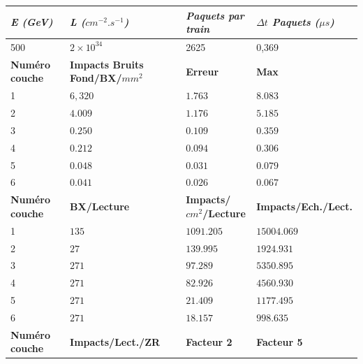 \begin{table}[h]
\centering
\scriptsize
\begin{tabular}{|l|l|l|l|}
\hline
\textit{\textbf{E (GeV)}}       & \textit{\textbf{L ($cm^{-2}.s^{-1}$)}}           & \textit{\textbf{Paquets par train}}         & \textit{\textbf{$\Delta t$ Paquets ($\mu s$)}} \\ \hline
500                             & $2 \times 10^{34}$      & 2625                                        & 0,369                              \\ \hline
\textbf{Numéro couche} & \textbf{Impacts Bruits Fond/BX/$mm^2$} & \textbf{Erreur}              & \textbf{Max}                \\ \hline
1             & $6,320$                 & $1.763$            & $8.083$               \\ \hline
2             & $4.009$                 & $1.176$            & $5.185$               \\ \hline
3             & $0.250$                 & $0.109$            & $0.359$               \\ \hline
4             & $0.212$                 & $0.094$            & $0.306$               \\ \hline
5             & $0.048$                 & $0.031$            & $0.079$               \\ \hline
6             & $0.041$                 & $0.026$            & $0.067$               \\ \hline
\textbf{Numéro couche} & \textbf{BX/Lecture}             & \textbf{Impacts/$cm^2$/Lecture} & \textbf{Impacts/Ech./Lect.} \\ \hline
1             & $135$                   & $1091.205$         & $15004.069$         \\ \hline
2             & $27$                    & $139.995$          & $1924.931$          \\ \hline
3             & $271$                   & $97.289$           & $5350.895$            \\ \hline
4             & $271$                   & $82.926$           & $4560.930$             \\ \hline
5             & $271$                   & $21.409$           & $1177.495$            \\ \hline
6             & $271$                   & $18.157$           & $998.635$             \\ \hline
\textbf{Numéro couche} & \textbf{Impacts/Lect./ZR}        & \textbf{Facteur 2}              & \textbf{Facteur 5}            \\ \hline

\end{tabular}
\end{table}
